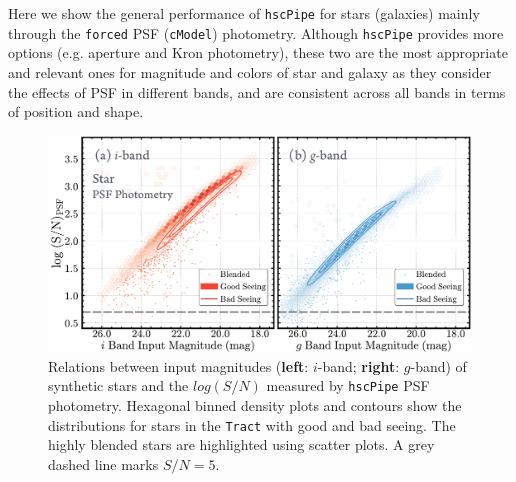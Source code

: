 \documentclass[useamsfonts]{pasj01}
\def\hscpipe{\texttt{hscPipe}}
\def\cmodel{\texttt{cModel}}
\def\forced{\texttt{forced}}
\def\tract{\texttt{Tract}}
\begin{document}
    Here we show the general performance of \hscpipe{} for stars (galaxies) 
    mainly through the \forced{} PSF (\cmodel{}) photometry. 
    Although \hscpipe{} provides more options (e.g. aperture and Kron photometry), 
    these two are the most appropriate and relevant ones for magnitude and colors of 
    star and galaxy as they consider the effects of PSF in different bands, 
    and are consistent across all bands in terms of position and shape. 


\begin{figure}
    \begin{center}
        \includegraphics[width=\textwidth]{fig/synpipe_psf_sn}
    \end{center}
    \caption{
        Relations between input magnitudes (\textbf{left}: $i$-band; \textbf{right}: 
        $g$-band) of synthetic stars and the $log(S/N)$ measured by \hscpipe{} PSF 
        photometry.  
        Hexagonal binned density plots and contours show the distributions for 
        stars in the \tract{} with good and bad seeing. 
        The highly blended stars are highlighted using scatter plots. 
        A grey dashed line marks $S/N = 5$.
        }
    \label{fig:star_sn}
\end{figure}
\end{document}
